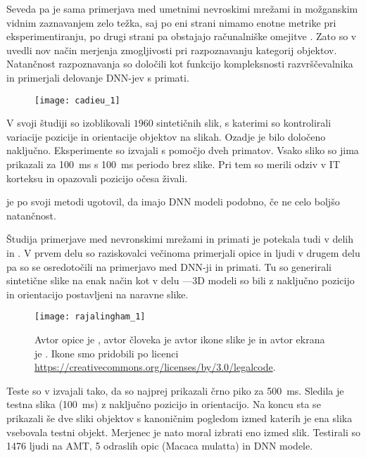 Seveda pa je sama primerjava med umetnimi nevroskimi mrežami in možganskim vidnim zaznavanjem zelo težka, saj po eni strani nimamo enotne metrike pri eksperimentiranju, po drugi  strani pa obstajajo računalniške omejitve \cite{cadieu2014the}. Zato so v \cite{cadieu2014the} uvedli nov način merjenja zmogljivosti pri razpoznavanju kategorij objektov. Natančnost razpoznavanja so določili kot funkcijo kompleksnosti razvrščevalnika in primerjali delovanje DNN-jev s primati. 

\begin{figure}[!htbp]
	\centering
	\texttt{[image: cadieu\_1]}
	\caption{}
\end{figure}


V svoji študiji so izoblikovali $1960$ sintetičnih slik, s katerimi so kontrolirali variacije pozicije in orientacije objektov na slikah. Ozadje je bilo določeno naključno. Eksperimente so izvajali s pomočjo dveh primatov. Vsako sliko so jima prikazali za \SI{100}{\ms} s \SI{100}{\ms} periodo brez slike. Pri tem so merili odziv v IT korteksu in opazovali pozicijo očesa živali. 

 je po svoji metodi ugotovil, da imajo DNN modeli podobno, če ne celo boljšo natančnost.


Študija primerjave med nevronskimi mrežami in primati je potekala tudi v delih \cite{rajalingham2015comparison} in \cite{rajalingham2018largescale}. V prvem delu so raziskovalci večinoma primerjali opice in ljudi v drugem delu pa so se osredotočili na primerjavo med DNN-ji in primati. Tu so generirali sintetične slike na enak način kot v delu \cite{kheradpisheh2016deep}---3D modeli so bili z naključno pozicijo in orientacijo postavljeni na naravne slike. 

\begin{figure}[!htbp]
	\centering
	\texttt{[image: rajalingham\_1]}
	\caption{Avtor opice je \cite{monkeyicon}, avtor človeka je \cite{humanicon} avtor ikone slike je \cite{imageicon} in avtor ekrana je \cite{computericon}. Ikone smo pridobili po licenci \url{https://creativecommons.org/licenses/by/3.0/legalcode}.}
\end{figure}

Teste so v \cite{rajalingham2018largescale} izvajali  tako, da so najprej prikazali črno piko za \SI{500}{\ms}. Sledila je testna slika (\SI{100}{\ms}) z naključno pozicijo in orientacijo. Na koncu sta se prikazali še dve sliki objektov s kanoničnim pogledom izmed katerih je ena slika vsebovala testni objekt. Merjenec je nato moral izbrati eno izmed slik. Testirali so 1476 ljudi na AMT, 5 odraslih opic (Macaca mulatta) in DNN modele.

